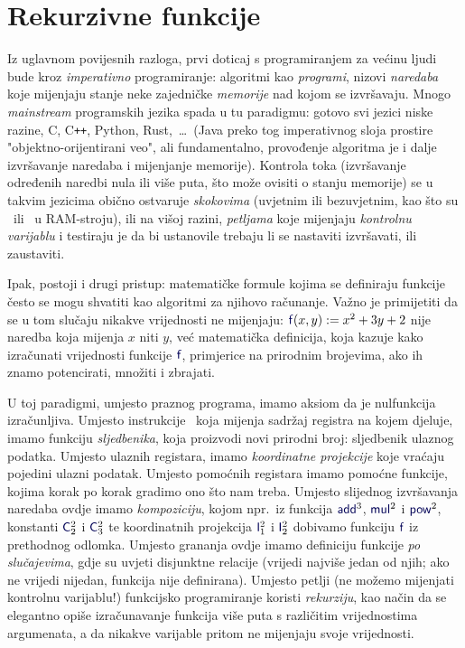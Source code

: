 \chapter{Rekurzivne funkcije}\label{ch:rek}

Iz uglavnom povijesnih razloga, prvi doticaj s programiranjem za većinu ljudi bude kroz \emph{imperativno} programiranje: algoritmi kao \emph{programi}, nizovi \emph{naredaba} koje mijenjaju stanje neke zajedničke \emph{memorije} nad kojom se izvršavaju. Mnogo \emph{mainstream} programskih jezika spada u tu paradigmu: gotovo svi jezici niske razine, C, C\texttt{++}, Python, Rust,~\ldots\ (Java preko tog imperativnog sloja prostire "objektno-orijentirani veo", ali fundamentalno, provođenje algoritma je i dalje izvršavanje naredaba i mijenjanje memorije). Kontrola toka (izvršavanje određenih naredbi nula ili više puta, što može ovisiti o stanju memorije) se u takvim jezicima obično ostvaruje \emph{skokovima} (uvjetnim ili bezuvjetnim, kao što su \dec\ ili \goto\ u RAM-stroju), ili na višoj razini, \emph{petljama} koje mijenjaju \emph{kontrolnu varijablu} i testiraju je da bi ustanovile trebaju li se nastaviti izvršavati, ili zaustaviti.

Ipak, postoji i drugi pristup: matematičke formule kojima se definiraju funkcije često se mogu shvatiti kao algoritmi za njihovo računanje. Važno je primijetiti da se u tom slučaju nikakve vrijednosti ne mijenjaju: $\f f(x,y):=x^2+3y+2$ nije naredba koja mijenja $x$ niti $y$, već matematička definicija, koja kazuje kako izračunati vrijednosti funkcije $\f f$, primjerice na prirodnim brojevima, ako ih znamo potencirati, množiti i zbrajati.

U toj paradigmi, umjesto praznog programa, imamo aksiom da je nulfunkcija izračunljiva. Umjesto instrukcije \inc\ koja mijenja sadržaj registra na kojem djeluje, imamo funkciju \emph{sljedbenika}, koja proizvodi novi prirodni broj: sljedbenik ulaznog podatka. Umjesto ulaznih registara, imamo \emph{koordinatne projekcije} koje vraćaju pojedini ulazni podatak. Umjesto pomoćnih registara imamo pomoćne funkcije, kojima korak po korak gradimo ono što nam treba. Umjesto slijednog izvršavanja naredaba ovdje imamo \emph{kompoziciju}, kojom npr.\ iz funkcija $\f{add}^3$, $\f{mul}^2$ i $\f{pow}^2$, konstanti $\f C_2^2$ i $\f C_3^2$ te koordinatnih projekcija $\f I_1^2$ i $\f I_2^2$ dobivamo funkciju $\f f$ iz prethodnog odlomka. Umjesto grananja ovdje imamo definiciju funkcije \emph{po slučajevima}, gdje su uvjeti disjunktne relacije (vrijedi najviše jedan od njih; ako ne vrijedi nijedan, funkcija nije definirana). Umjesto petlji (ne možemo mijenjati kontrolnu varijablu!) funkcijsko programiranje koristi \emph{rekurziju}, kao način da se elegantno opiše izračunavanje funkcija više puta s različitim vrijednostima argumenata, a da nikakve varijable pritom ne mijenjaju svoje vrijednosti. 

